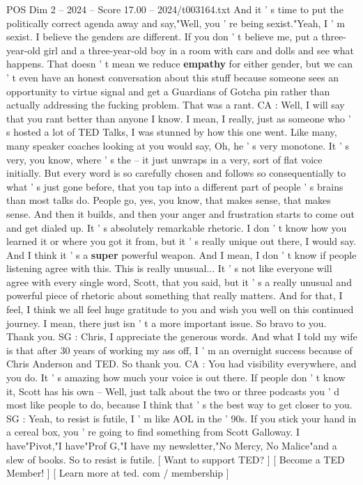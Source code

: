 \begin{textsample}{POS Dim 2 – 2024 – Score 17.00 – 2024/t003164.txt}
And it ' s time to put the politically correct agenda away and say,"Well, you ' re being sexist."Yeah, I ' m sexist.
I believe the genders are different.
If you don ' t believe me, put a three-year-old girl and a three-year-old boy in a room with cars and dolls and see what happens.
That doesn ' t mean we reduce \textbf{empathy} for either gender, but we can ' t even have an honest conversation about this stuff because someone sees an opportunity to virtue signal and get a Guardians of Gotcha pin rather than actually addressing the fucking problem.
That was a rant.
CA : Well, I will say that you rant better than anyone I know.
I mean, I really, just as someone who ' s hosted a lot of TED Talks, I was stunned by how this one went.
Like many, many speaker coaches looking at you would say, Oh, he ' s very monotone.
It ' s very, you know, where ' s the -- it just unwraps in a very, sort of flat voice initially.
But every word is so carefully chosen and follows so consequentially to what ' s just gone before, that you tap into a different part of people ' s brains than most talks do.
People go, yes, you know, that makes sense, that makes sense.
And then it builds, and then your anger and frustration starts to come out and get dialed up.
It ' s absolutely remarkable rhetoric.
I don ' t know how you learned it or where you got it from, but it ' s really unique out there, I would say.
And I think it ' s a \textbf{super} powerful weapon.
And I mean, I don ' t know if people listening agree with this.
This is really unusual...
It ' s not like everyone will agree with every single word, Scott, that you said, but it ' s a really unusual and powerful piece of rhetoric about something that really matters.
And for that, I feel, I think we all feel huge gratitude to you and wish you well on this continued journey.
I mean, there just isn ' t a more important issue.
So bravo to you.
Thank you.
SG : Chris, I appreciate the generous words.
And what I told my wife is that after 30 years of working my ass off, I ' m an overnight success because of Chris Anderson and TED.
So thank you.
CA : You had visibility everywhere, and you do.
It ' s amazing how much your voice is out there.
If people don ' t know it, Scott has his own -- Well, just talk about the two or three podcasts you ' d most like people to do, because I think that ' s the best way to get closer to you.
SG : Yeah, to resist is futile, I ' m like AOL in the ' 90s.
If you stick your hand in a cereal box, you ' re going to find something from Scott Galloway.
I have"Pivot,"I have"Prof G,"I have my newsletter,"No Mercy, No Malice"and a slew of books.
So to resist is futile. [ Want to support TED? ] [ Become a TED Member! ] [ Learn more at ted. com / membership ]

\end{textsample}
